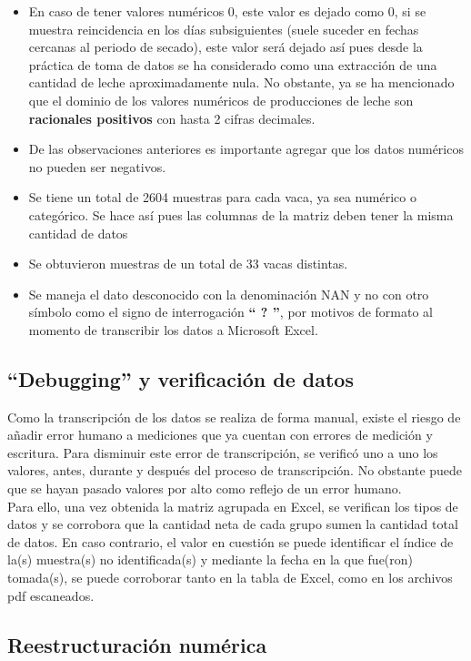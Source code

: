 \begin{itemize}
    \item En caso de tener valores numéricos 0, este valor es dejado como 0, si se muestra reincidencia en los días subsiguientes (suele suceder en fechas cercanas al periodo de secado), este valor será dejado así pues desde la práctica de toma de datos se ha considerado como una extracción de una cantidad de leche aproximadamente nula. No obstante, ya se ha mencionado que el dominio de los valores numéricos de producciones de leche son \textbf{racionales positivos} con hasta 2 cifras decimales.
    \item De las observaciones anteriores es importante agregar que los datos numéricos no pueden ser negativos.
    \item Se tiene un total de 2604 muestras para cada vaca, ya sea numérico o categórico. Se hace así pues las columnas de la matriz deben tener la misma cantidad de datos
    \item Se obtuvieron muestras de un total de 33 vacas distintas.
    \item Se maneja el dato desconocido con la denominación NAN y no con otro símbolo como el signo de interrogación \textbf{`` ? ''}, por motivos de formato al momento de transcribir los datos a Microsoft Excel.
\end{itemize}

\subsection{``Debugging'' y verificación de datos}

Como la transcripción de los datos se realiza de forma manual, existe el riesgo de añadir error humano a mediciones que ya cuentan con errores de medición y escritura. Para disminuir este error de transcripción, se verificó uno a uno los valores, antes, durante y después del proceso de transcripción. No obstante puede que se hayan pasado valores por alto como reflejo de un error humano.\\

Para ello, una vez obtenida la matriz agrupada en Excel, se verifican los tipos de datos y se corrobora que la cantidad neta de cada grupo sumen la cantidad total de datos. En caso contrario, el valor en cuestión se puede identificar el índice de la(s) muestra(s) no identificada(s) y mediante la fecha en la que fue(ron)  tomada(s), se puede corroborar tanto en la tabla de Excel, como en los archivos pdf escaneados.

\subsection{Reestructuración numérica}

